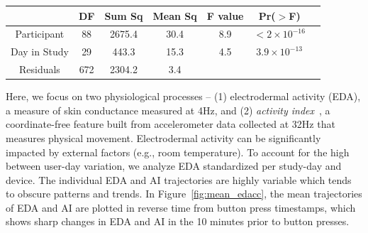 \documentclass[12pt]{amsart}
\begin{document}
\begin{table}[!th]
\begin{tabular}{ccccccc}\hline
      & DF & Sum Sq & Mean Sq & F value & Pr($>$F) \\ \hline
        Participant & 88 & 2675.4 & 30.4 & 8.9 & $< 2 \times 10^{-16}$ \\
        Day in Study & 29 & 443.3 & 15.3 & 4.5 & $3.9 \times 10^{-13}$ \\
        Residuals & 672 & 2304.2 & 3.4 \\ \hline
      \end{tabular}  
      \label{tab:anova}
\end{table}

Here, we focus on two physiological processes -- (1) electrodermal activity (EDA), a measure of skin conductance measured at 4Hz, and  (2) \emph{activity index}~\cite{10.1371/journal.pone.0160644}, a coordinate-free feature built from accelerometer data collected at 32Hz that measures physical movement.  Electrodermal activity can be significantly impacted by external factors (e.g., room temperature).  To account for the high between user-day variation, we analyze EDA standardized per study-day and  device. The individual EDA and AI trajectories are highly variable which tends to obscure patterns and trends.  In Figure~\ref{fig:mean_edacc}, the mean trajectories of EDA and AI are plotted in reverse time from button press timestamps, which shows sharp changes in EDA and AI in the 10 minutes prior to button presses.
\end{document}
